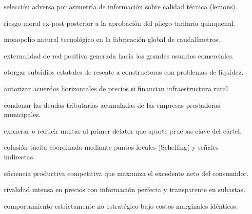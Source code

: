 \begin{opts}
    \item selección adversa por asimetría de información sobre calidad técnica (lemons).
    \item riesgo moral ex-post posterior a la aprobación del pliego tarifario quinquenal.
    \item monopolio natural tecnológico en la fabricación global de caudalímetros.
    \item externalidad de red positiva generada hacia los grandes usuarios comerciales.
\end{opts}

\begin{opts}
    \item otorgar subsidios estatales de rescate a constructoras con problemas de liquidez.
    \item autorizar acuerdos horizontales de precios si financian infraestructura rural.
    \item condonar las deudas tributarias acumuladas de las empresas prestadoras municipales.
    \item exonerar o reducir multas al primer delator que aporte pruebas clave del cártel.
\end{opts}

\begin{opts}
    \item colusión tácita coordinada mediante puntos focales (Schelling) y señales indirectas.
    \item eficiencia productiva competitiva que maximiza el excedente neto del consumidor.
    \item rivalidad intensa en precios con información perfecta y transparente en subastas.
    \item comportamiento estrictamente no estratégico bajo costos marginales idénticos.
\end{opts}

